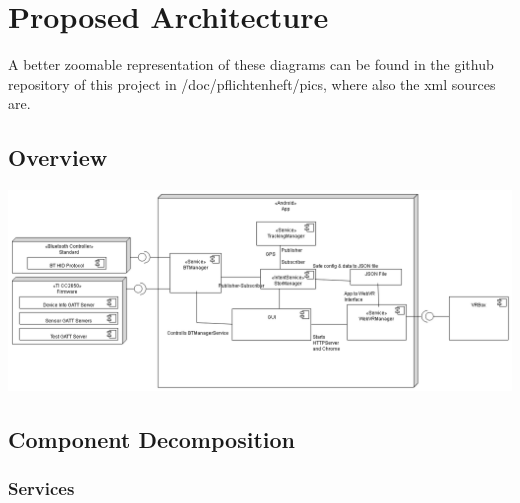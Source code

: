\section{Proposed Architecture}
A better zoomable representation of these diagrams can be found in the github repository of this project in /doc/pflichtenheft/pics, where also the xml sources are.
\subsection{Overview}

\hspace{-3cm} \includegraphics[width=1.4\textwidth]{pics/composite_app.png}


\subsection{Component Decomposition}

\subsubsection{Services}

